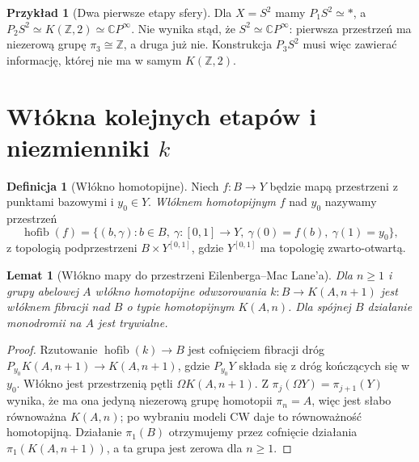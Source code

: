 \documentclass[11pt,a4paper,oneside]{report}
\newcommand{\C}{\mathbb{C}}
\newcommand{\Z}{\mathbb{Z}}
\theoremstyle{plain}
\newtheorem{lemat}[twierdzenie]{Lemat}
\theoremstyle{definition}
\newtheorem{definicja}[twierdzenie]{Definicja}
\newtheorem{przyklad}[twierdzenie]{Przykład}
\theoremstyle{remark}
\begin{document}
\begin{przyklad}[Dwa pierwsze etapy sfery]
Dla $X=S^2$ mamy $P_1S^2\simeq *$, a
$P_2S^2\simeq K(\Z,2)\simeq\C P^\infty$.
Nie wynika stąd, że $S^2\simeq\C P^\infty$:
pierwsza przestrzeń ma niezerową grupę $\pi_3\cong\Z$,
a druga już nie. Konstrukcja $P_3S^2$ musi więc
zawierać informację, której nie ma w samym $K(\Z,2)$.
\end{przyklad}

\section{Włókna kolejnych etapów i niezmienniki \texorpdfstring{$k$}{k}}
\begin{definicja}[Włókno homotopijne]
Niech $f:B\to Y$ będzie mapą przestrzeni z punktami
bazowymi i $y_0\in Y$. \emph{Włóknem homotopijnym} $f$
nad $y_0$ nazywamy przestrzeń
\[
\operatorname{hofib}(f)=\{(b,\gamma):b\in B,
\ \gamma:[0,1]\to Y,\ \gamma(0)=f(b),\ \gamma(1)=y_0\},
\]
z topologią podprzestrzeni $B\times Y^{[0,1]}$,
gdzie $Y^{[0,1]}$ ma topologię zwarto-otwartą.
\end{definicja}

\begin{lemat}[Włókno mapy do przestrzeni Eilenberga--Mac Lane'a]
\label{lem:hofib-K-v7}
Dla $n\ge1$ i grupy abelowej $A$ włókno homotopijne
odwzorowania $k:B\to K(A,n+1)$ jest włóknem fibracji
nad $B$ o typie homotopijnym $K(A,n)$.
Dla spójnej $B$ działanie monodromii na $A$ jest trywialne.
\end{lemat}
\begin{proof}
Rzutowanie $\operatorname{hofib}(k)\to B$ jest cofnięciem
fibracji dróg $P_{y_0}K(A,n+1)\to K(A,n+1)$,
gdzie $P_{y_0}Y$ składa się z dróg kończących się w $y_0$.
Włókno jest przestrzenią pętli $\Omega K(A,n+1)$.
Z $\pi_j(\Omega Y)=\pi_{j+1}(Y)$ wynika, że ma ona
jedyną niezerową grupę homotopii $\pi_n=A$,
więc jest słabo równoważna $K(A,n)$; po wybraniu
modeli CW daje to równoważność homotopijną.
Działanie $\pi_1(B)$ otrzymujemy przez cofnięcie
działania $\pi_1(K(A,n+1))$, a ta grupa jest zerowa
dla $n\ge1$.
\end{proof}
\end{document}
